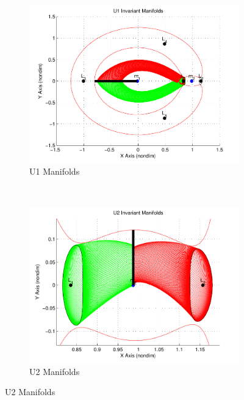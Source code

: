 \begin{figure}
     \centering
        \begin{subfigure}[b]{0.25\textwidth}
                \includegraphics[width=\columnwidth]{figures/2015_AAS/U1_Manifolds}
                \caption{U1 Manifolds}
                \label{fig:u1_manifolds}
        \end{subfigure}%
        ~%
        \begin{subfigure}[b]{0.25\textwidth}
                \includegraphics[width=\columnwidth]{figures/2015_AAS/U2_Manifolds}
                \caption{U2 Manifolds}

\end{subfigure}
\end{figure}

